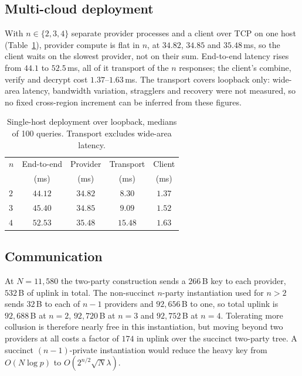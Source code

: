 \documentclass[a4paper,fleqn]{cas-sc}
\begin{document}
\subsection{Multi-cloud deployment}
\label{sec:wanresult}
With $n\in\{2,3,4\}$ separate provider processes and a client over TCP on one
host (Table~\ref{tab:wan}), provider compute is flat in $n$, at $34.82$,
$34.85$ and $35.48$\,ms, so the client waits on the slowest provider, not on
their sum. End-to-end latency rises from $44.1$ to $52.5$\,ms, all of it
transport of the $n$ responses; the client's combine, verify and decrypt cost
$1.37$--$1.63$\,ms. The transport covers loopback only: wide-area latency,
bandwidth variation, stragglers and recovery were not measured, so no fixed
cross-region increment can be inferred from these figures.

\begin{table}[pos=htbp]
\caption{Single-host deployment over loopback, medians of 100 queries.
Transport excludes wide-area latency.}
\label{tab:wan}
\centering
\footnotesize
\setlength{\tabcolsep}{3pt}
\renewcommand{\arraystretch}{1.2}
\begin{tabular*}{\tblwidth}{@{\extracolsep{\fill}}lcccc@{}}
\toprule
$n$ & End-to-end & Provider & Transport & Client \\
    & (ms)       & (ms)     & (ms)      & (ms) \\
\midrule
$2$ & $44.12$ & $34.82$ & $8.30$  & $1.37$ \\
$3$ & $45.40$ & $34.85$ & $9.09$  & $1.52$ \\
$4$ & $52.53$ & $35.48$ & $15.48$ & $1.63$ \\
\bottomrule
\end{tabular*}
\end{table}

\subsection{Communication}
\label{sec:commresult}
At $N=11{,}580$ the two-party construction sends a $266$\,B key to each
provider, $532$\,B of uplink in total. The non-succinct $n$-party
instantiation used for $n>2$ sends $32$\,B to each of $n-1$ providers and
$92{,}656$\,B to one, so total uplink is $92{,}688$\,B at $n=2$,
$92{,}720$\,B at $n=3$ and $92{,}752$\,B at $n=4$. Tolerating more collusion
is therefore nearly free in this instantiation, but moving beyond two
providers at all costs a factor of $174$ in uplink over the succinct two-party
tree. A succinct
$(n{-}1)$-private instantiation would reduce the heavy key from $O(N\log p)$
to $O(2^{n/2}\sqrt{N}\lambda)$.
\end{document}
